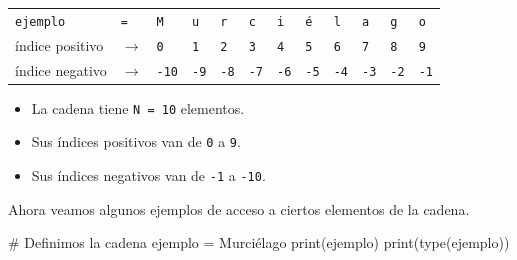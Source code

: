 \documentclass[
  spanish,
  letterpaper,
]{scrbook}
\newenvironment{Shaded}{\begin{snugshade}}{\end{snugshade}}
\newcommand{\BuiltInTok}[1]{\textcolor[rgb]{0.00,0.23,0.31}{#1}}
\newcommand{\CommentTok}[1]{\textcolor[rgb]{0.37,0.37,0.37}{#1}}
\newcommand{\NormalTok}[1]{\textcolor[rgb]{0.00,0.23,0.31}{#1}}
\newcommand{\OperatorTok}[1]{\textcolor[rgb]{0.37,0.37,0.37}{#1}}
\newcommand{\StringTok}[1]{\textcolor[rgb]{0.13,0.47,0.30}{#1}}
\providecommand{\tightlist}{%
  \setlength{\itemsep}{0pt}\setlength{\parskip}{0pt}}
\theoremstyle{definition}
\theoremstyle{remark}
\begin{document}
\begin{longtable}[]{@{}
  >{\raggedleft\arraybackslash}p{}
  >{\centering\arraybackslash}p{}
  >{\centering\arraybackslash}p{}
  >{\centering\arraybackslash}p{}
  >{\centering\arraybackslash}p{}
  >{\centering\arraybackslash}p{}
  >{\centering\arraybackslash}p{}
  >{\centering\arraybackslash}p{}
  >{\centering\arraybackslash}p{}
  >{\centering\arraybackslash}p{}
  >{\centering\arraybackslash}p{}
  >{\centering\arraybackslash}p{}@{}}
\toprule\noalign{}
\endhead
\bottomrule\noalign{}
\endlastfoot
\texttt{ejemplo} & \texttt{=} & \texttt{M} & \texttt{u} & \texttt{r} &
\texttt{c} & \texttt{i} & \texttt{é} & \texttt{l} & \texttt{a} &
\texttt{g} & \texttt{o} \\
índice positivo & \(\rightarrow\) & \texttt{0} & \texttt{1} & \texttt{2}
& \texttt{3} & \texttt{4} & \texttt{5} & \texttt{6} & \texttt{7} &
\texttt{8} & \texttt{9} \\
índice negativo & \(\rightarrow\) & \texttt{-10} & \texttt{-9} &
\texttt{-8} & \texttt{-7} & \texttt{-6} & \texttt{-5} & \texttt{-4} &
\texttt{-3} & \texttt{-2} & \texttt{-1} \\
\end{longtable}

\begin{itemize}
\tightlist
\item
  La cadena tiene \texttt{N\ =\ 10} elementos.
\item
  Sus índices positivos van de \texttt{0} a \texttt{9}.
\item
  Sus índices negativos van de \texttt{-1} a \texttt{-10}.
\end{itemize}

Ahora veamos algunos ejemplos de acceso a ciertos elementos de la
cadena.

\begin{Shaded}
\begin{Highlighting}[]
\CommentTok{\# Definimos la cadena}
\NormalTok{ejemplo }\OperatorTok{=} \StringTok{\textquotesingle{}Murciélago\textquotesingle{}}
\BuiltInTok{print}\NormalTok{(ejemplo)}
\BuiltInTok{print}\NormalTok{(}\BuiltInTok{type}\NormalTok{(ejemplo))}
\end{Highlighting}
\end{Shaded}
\end{document}
